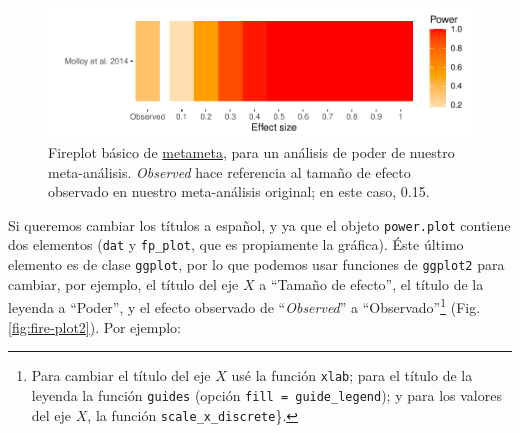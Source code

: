 \documentclass[
  bookmarksnumbered]{article}
\begin{document}
\begin{figure}
\centering
\includegraphics{Meta-analysis_files/figure-latex/fire-plot1-1.pdf}
\caption{\label{fig:fire-plot1}Fireplot básico de \href{https://www.dsquintana.blog/metameta-r-package-meta-analysis/}{metameta}, para un análisis de poder de nuestro meta-análisis. \emph{Observed} hace referencia al tamaño de efecto observado en nuestro meta-análisis original; en este caso, 0.15.}
\end{figure}

Si queremos cambiar los títulos a español, y ya que el objeto \texttt{power.plot} contiene dos elementos (\texttt{dat} y \texttt{fp\_plot}, que es propiamente la gráfica). Éste último elemento es de clase \texttt{ggplot}, por lo que podemos usar funciones de \texttt{ggplot2} para cambiar, por ejemplo, el título del eje \(X\) a ``Tamaño de efecto'', el título de la leyenda a ``Poder'', y el efecto observado de ``\emph{Observed}'' a ``Observado''\footnote{Para cambiar el título del eje \(X\) usé la función \texttt{xlab}; para el título de la leyenda la función \texttt{guides} (opción \texttt{fill\ =\ guide\_legend}); y para los valores del eje \(X\), la función \texttt{scale\_x\_discrete}\}.} (Fig. \ref{fig:fire-plot2}). Por ejemplo:
\end{document}
